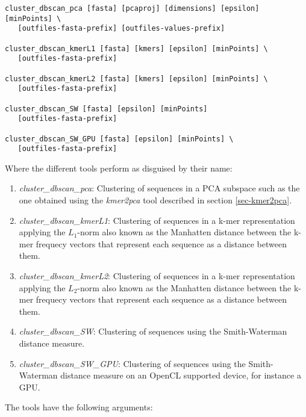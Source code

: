 \begin{lstlisting}
cluster_dbscan_pca [fasta] [pcaproj] [dimensions] [epsilon] [minPoints] \
   [outfiles-fasta-prefix] [outfiles-values-prefix]

cluster_dbscan_kmerL1 [fasta] [kmers] [epsilon] [minPoints] \
   [outfiles-fasta-prefix]

cluster_dbscan_kmerL2 [fasta] [kmers] [epsilon] [minPoints] \
   [outfiles-fasta-prefix]

cluster_dbscan_SW [fasta] [epsilon] [minPoints]
   [outfiles-fasta-prefix]

cluster_dbscan_SW_GPU [fasta] [epsilon] [minPoints] \
   [outfiles-fasta-prefix]   
\end{lstlisting}
Where the different tools perform as disguised by their name:
\begin{enumerate}
  \item \emph{cluster\_dbscan\_pca}: Clustering of sequences in a PCA
    subspace such as the one obtained using the \emph{kmer2pca} tool
    described in section \ref{sec-kmer2pca}.
  \item \emph{cluster\_dbscan\_kmerL1}: Clustering of sequences in a
    k-mer representation applying the $L_1$-norm also known as the
    Manhatten distance between the k-mer frequecy vectors that
    represent each sequence as a distance between them.
  \item \emph{cluster\_dbscan\_kmerL2}: Clustering of sequences in a
    k-mer representation applying the $L_2$-norm also known as the
    Manhatten distance between the k-mer frequecy vectors that
    represent each sequence as a distance between them.
  \item \emph{cluster\_dbscan\_SW}: Clustering of sequences using the
    Smith-Waterman distance measure.
  \item \emph{cluster\_dbscan\_SW\_GPU}: Clustering of sequences using
    the Smith-Waterman distance measure on an OpenCL supported device,
    for instance a GPU.
\end{enumerate}
The tools have the following arguments:
